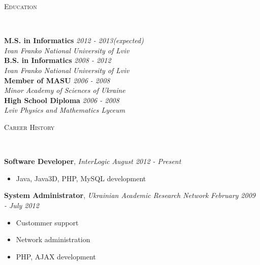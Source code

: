 \documentclass[9pt]{article}
\newenvironment{changemargin}[2]{%
  \begin{list}{}{%
    \setlength{\topsep}{0pt}%
    \setlength{\leftmargin}{#1}%
    \setlength{\rightmargin}{#2}%
    \setlength{\listparindent}{\parindent}%
    \setlength{\itemindent}{\parindent}%
    \setlength{\parsep}{\parskip}%
  }%
  \item[]}{\end{list}
}
\newcommand{\lineover}{
  \begin{changemargin}{-1mm}{-1mm}
    \vspace*{-8pt}
    \hrulefill \\
    \vspace*{-2pt}
  \end{changemargin}
}
\newcommand{\header}[1]{
  \begin{changemargin}{-12mm}{-12mm}
    \scshape{#1}\\
    \lineover
  \end{changemargin}
}
\newenvironment{body}{
  \vspace*{-16pt}
  \begin{changemargin}{-6mm}{-12mm}
}{
  \end{changemargin}
}
\begin{document}



\header{Education}

\begin{body}
  \vspace{14pt}
  \textbf{M.S. in Informatics} \hfill \emph{2012 - 2013(expected)} \\
  \emph{Ivan Franko National University of Lviv} \\
  \medskip
  \textbf{B.S. in Informatics} \hfill \emph{2008 - 2012} \\
  \emph{Ivan Franko National University of Lviv} \\
  \medskip
  \textbf{Member of MASU} \hfill \emph{2006 - 2008} \\
  \emph{Minor Academy of Sciences of Ukraine} \\
  \medskip
  \textbf{High School Diploma} \hfill \emph{2006 - 2008} \\
  \emph{Lviv Physics and Mathematics Lyceum} \\
\end{body}

\smallskip


\header{Career History}

\begin{body}
  \vspace{14pt}
  \textbf{Software Developer}, \emph{ InterLogic} \hfill \emph{August 2012 - Present}\\
  \vspace*{-4pt}
  \begin{itemize} \itemsep -0pt
    \item Java, Java3D, PHP, MySQL development
  \end{itemize}
  \textbf{System Administrator}, \emph{Ukrainian Academic Research Network} \hfill \emph{February 2009 - July 2012}\\
  \vspace*{-4pt}
  \begin{itemize} \itemsep -0pt
    \item Custommer support
    \item Network administration
    \item PHP, AJAX development
  \end{itemize}

\end{body}
\end{document}
